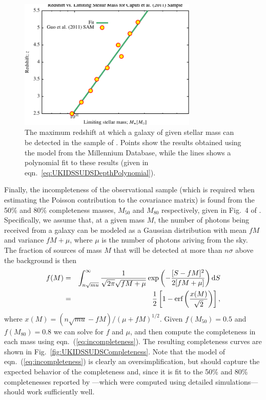 \begin{figure}
 \begin{center}
 \includegraphics[width=85mm,trim=0mm 0mm 0mm 4mm,clip]{Plots/DataAnalysis/UKIDSSUDSMassLuminosityRelation.pdf}
 \caption{The maximum redshift at which a galaxy of given stellar mass can be detected in the sample of \protect\cite{caputi_stellar_2011}. Points show the results obtained using the \protect\cite{henriques_confronting_2012} model from the Millennium Database, while the lines shows a polynomial fit to these results (given in eqn.~\ref{eq:UKIDSSUDSDepthPolynomial}).}
 \end{center}
 \label{fig:UKIDSSUDSMassRedshift}
\end{figure}

Finally, the incompleteness of the observational sample (which is required when estimating the Poisson contribution to the covariance matrix) is found from the 50\% and 80\% completeness masses, $M_{50}$ and $M_{80}$ respectively, given in Fig.~4 of \cite{caputi_stellar_2011}. Specifically, we assume that, at a given mass $M$, the number of photons being received from a galaxy can be modeled as a Gaussian distribution with mean $f M$ and variance $fM+\mu$, where $\mu$ is the number of photons ariving from the sky. The fraction of sources of mass $M$ that will be detected at more than $n \sigma$ above the background is then
\begin{eqnarray}
f(M) & = & \int_{n\sqrt{mu}}^\infty {1 \over \sqrt{2 \pi} \sqrt{f M + \mu}} \exp\left( - {[S-fM]^2 \over 2 [f M + \mu]} \right) \mathrm{d}S \nonumber \\
     & = & {1 \over 2}\left[ 1 - \hbox{erf}\left( {x(M) \over \sqrt{2}} \right)  \right],
\label{eq:incompleteness}
\end{eqnarray}
where $x(M) = (n \sqrt{mu} - f M)/(\mu+fM)^{1/2}$. Given $f(M_\mathrm{50})=0.5$ and $f(M_\mathrm{80})=0.8$ we can solve for $f$ and $\mu$, and then compute the completeness in each mass using eqn.~(\ref{eq:incompleteness}). The resulting completeness curves are shown in Fig.~\ref{fig:UKIDSSUDSCompleteness}. Note that the model of eqn.~(\ref{eq:incompleteness}) is clearly an oversimplification, but should capture the expected behavior of the completeness and, since it is fit to the 50\% and 80\% completenesses reported by \cite{caputi_stellar_2011}---which were computed using detailed simulations---should work sufficiently well.

